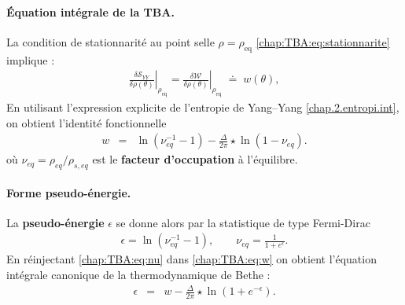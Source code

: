


\paragraph{Équation intégrale de la TBA.}

La condition de stationnarité au point selle \(\rho=\rho_{\mathrm{eq}}\) \eqref{chap:TBA:eq:stationnarite} implique :
\begin{eqnarray}
	\left.\frac{\delta\mathcal{S}_{YY}}{\delta\rho(\theta)}\right|_{\rho_{\mathrm{eq}}} = \left.\frac{\delta\mathcal{W}}{\delta\rho(\theta)}\right|_{\rho_{\mathrm{eq}}}\;\doteq\;w(\theta),\label{chap:TBA:eq:stationnarite-2}
\end{eqnarray}
En utilisant l’expression explicite de l’entropie de Yang–Yang \eqref{chap.2.entropi.int}, on obtient l’identité fonctionnelle
\begin{eqnarray}
	w & = & \ln ( \nu_{\!eq}^{-1}  - 1 ) - \frac{\Delta}{2\pi} \star \ln ( 1 -  \nu_{\!eq}).\label{chap:TBA:eq:w}
\end{eqnarray}
où
\(
\nu_{\!eq}=\rho_{\!eq}/\rho_{s,\!eq}
\)
est le \textbf{facteur d’occupation} à l’équilibre.
\paragraph{Forme pseudo-énergie.}
La \textbf{pseudo-énergie} $\epsilon$ se donne alors par la statistique de type Fermi-Dirac
\begin{eqnarray}
	\epsilon =\ln(\nu^{-1}_{\!eq}-1),\qquad\nu_{\!eq}=\frac{1}{1+e^{\epsilon}}.\label{chap:TBA:eq:nu}%
\end{eqnarray}
En réinjectant \eqref{chap:TBA:eq:nu} dans \eqref{chap:TBA:eq:w} on obtient
l’équation intégrale canonique de la thermodynamique de Bethe :
\begin{eqnarray}
	\epsilon & = & w - \frac{\Delta}{2\pi} \star \ln ( 1  + e^{-\epsilon}).\label{chap:TBA:eq:e}%
\end{eqnarray}


